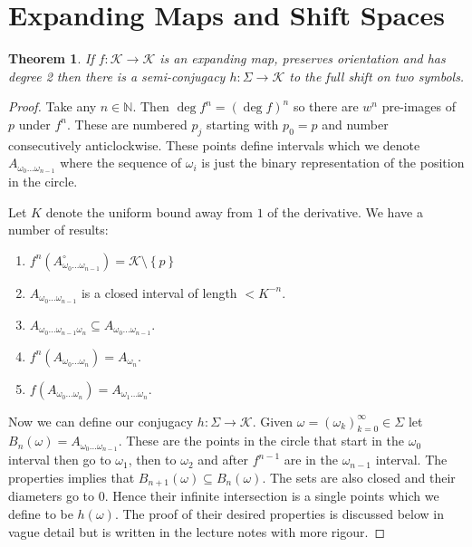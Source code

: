 \documentclass[11pt]{article}
\newcommand{\N}{\mathbb{N}}
\newtheorem{theorem}{Theorem}[section]
\begin{document}
\section{Expanding Maps and Shift Spaces}
\begin{theorem}
If $f:\mathcal{K}\to\mathcal{K}$ is an expanding map, preserves orientation and has degree 2 then there is a semi-conjugacy $h:\Sigma\to\mathcal{K}$ to the full shift on two symbols.

\begin{figure}[H]
	\centering
\end{figure}
\end{theorem}

\begin{proof}
Take any $n\in\N$.
Then $\deg f^n = (\deg f)^n$ so there are $w^n$ pre-images of $p$ under $f^n$.
These are numbered $p_j$ starting with $p_0=p$ and number consecutively anticlockwise.
These points define intervals which we denote $A_{\omega_0\dots\omega_{n-1}}$ where the sequence of $\omega_i$ is just the binary representation of the position in the circle.

Let $K$ denote the uniform bound away from $1$ of the derivative.
We have a number of results:
\begin{enumerate}
	\item $f^n(A_{\omega_0\dots\omega_{n-1}}^\circ)=\mathcal{K}\setminus\left\{p\right\}$
	\item $A_{\omega_0\dots\omega_{n-1}}$ is a closed interval of length $<K^{-n}$.
	\item $A_{\omega_0\dots\omega_{n-1}\omega_n}\subseteq A_{\omega_0\dots\omega_{n-1}}$.
	\item $f^n(A_{\omega_0\dots\omega_{n}})=A_{\omega_n}$.
	\item $f(A_{\omega_0\dots\omega_{n}})=A_{\omega_1\dots\omega_{n}}$.
\end{enumerate}

Now we can define our conjugacy $h:\Sigma\to\mathcal{K}$.
Given $\omega=(\omega_k)_{k=0}^\infty\in\Sigma$ let $B_n(\omega)=A_{\omega_0\dots\omega_{n-1}}$.
These are the points in the circle that start in the $\omega_0$ interval then go to $\omega_1$, then to $\omega_2$ and after $f^{n-1}$ are in the $\omega_{n-1}$ interval.
The properties implies that $B_{n+1}(\omega) \subseteq B_n(\omega)$.
The sets are also closed and their diameters go to $0$.
Hence their infinite intersection is a single points which we define to be $h(\omega)$.
The proof of their desired properties is discussed below in vague detail but is written in the lecture notes with more rigour.
\end{proof}
\end{document}
